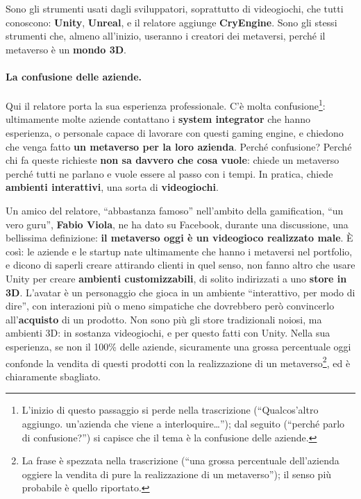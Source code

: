 Sono gli strumenti usati dagli sviluppatori, soprattutto di videogiochi, che
tutti conoscono: \textbf{Unity}, \textbf{Unreal}, e il relatore aggiunge
\textbf{CryEngine}. Sono gli stessi strumenti che, almeno all'inizio, useranno i
creatori dei metaversi, perché il metaverso è un \textbf{mondo 3D}.

\paragraph{La confusione delle aziende.} Qui il relatore porta la sua esperienza
professionale. C'è molta confusione\footnote{L'inizio di questo passaggio si
perde nella trascrizione (``Qualcos'altro aggiungo. un'azienda che viene a
interloquire\dots''); dal seguito (``perché parlo di confusione?'') si capisce
che il tema è la confusione delle aziende.}: ultimamente molte aziende contattano
i \textbf{system integrator} che hanno esperienza, o personale capace di lavorare
con questi gaming engine, e chiedono che venga fatto \textbf{un metaverso per la
loro azienda}. Perché confusione? Perché chi fa queste richieste \textbf{non sa
davvero che cosa vuole}: chiede un metaverso perché tutti ne parlano e vuole
essere al passo con i tempi. In pratica, chiede \textbf{ambienti interattivi},
una sorta di \textbf{videogiochi}.

Un amico del relatore, ``abbastanza famoso'' nell'ambito della gamification, ``un
vero guru'', \textbf{Fabio Viola}, ne ha dato su Facebook, durante una
discussione, una bellissima definizione: \textbf{il metaverso oggi è un
videogioco realizzato male}. È così: le aziende e le startup nate ultimamente
che hanno i metaversi nel portfolio, e dicono di saperli creare attirando clienti
in quel senso, non fanno altro che usare Unity per creare \textbf{ambienti
customizzabili}, di solito indirizzati a uno \textbf{store in 3D}. L'avatar è un
personaggio che gioca in un ambiente ``interattivo, per modo di dire'', con
interazioni più o meno simpatiche che dovrebbero però convincerlo
all'\textbf{acquisto} di un prodotto. Non sono più gli store tradizionali noiosi,
ma ambienti 3D: in sostanza videogiochi, e per questo fatti con Unity. Nella sua
esperienza, se non il 100\% delle aziende, sicuramente una grossa percentuale
oggi confonde la vendita di questi prodotti con la realizzazione di un
metaverso\footnote{La frase è spezzata nella trascrizione (``una grossa
percentuale dell'azienda oggiere la vendita di pure la realizzazione di un
metaverso''); il senso più probabile è quello riportato.}, ed è chiaramente
sbagliato.

